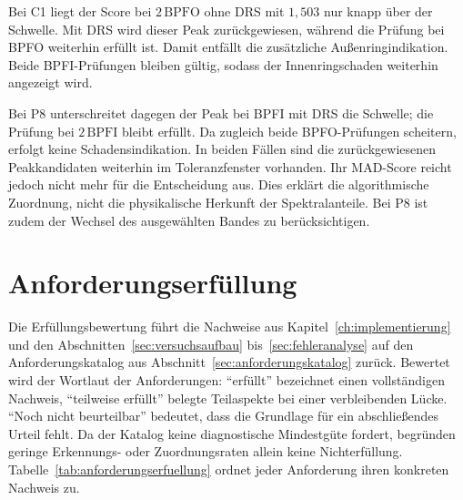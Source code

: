 Bei C1 liegt der Score bei $2\,\mathrm{BPFO}$ ohne DRS mit $1{,}503$ nur
knapp über der Schwelle. Mit DRS wird dieser Peak zurückgewiesen, während
die Prüfung bei BPFO weiterhin erfüllt ist. Damit entfällt die zusätzliche
Außenringindikation. Beide BPFI-Prüfungen bleiben gültig, sodass der
Innenringschaden weiterhin angezeigt wird.

Bei P8 unterschreitet dagegen der Peak bei BPFI mit DRS die Schwelle;
die Prüfung bei $2\,\mathrm{BPFI}$ bleibt erfüllt. Da zugleich beide
BPFO-Prüfungen scheitern, erfolgt keine Schadensindikation. In beiden Fällen
sind die zurückgewiesenen Peakkandidaten weiterhin im Toleranzfenster
vorhanden. Ihr MAD-Score reicht jedoch nicht mehr für die Entscheidung aus.
Dies erklärt die algorithmische Zuordnung, nicht die physikalische Herkunft
der Spektralanteile. Bei P8 ist zudem der Wechsel des ausgewählten Bandes
zu berücksichtigen.
\par\endgroup

\section{Anforderungserfüllung}
\label{sec:anforderungserfuellung}

Die Erfüllungsbewertung führt die Nachweise aus Kapitel~\ref{ch:implementierung}
und den Abschnitten~\ref{sec:versuchsaufbau} bis~\ref{sec:fehleranalyse} auf
den Anforderungskatalog aus Abschnitt~\ref{sec:anforderungskatalog} zurück.
Bewertet wird der Wortlaut der Anforderungen: \enquote{erfüllt} bezeichnet
einen vollständigen Nachweis, \enquote{teilweise erfüllt} belegte Teilaspekte
bei einer verbleibenden Lücke. \enquote{Noch nicht beurteilbar} bedeutet,
dass die Grundlage für ein abschließendes Urteil fehlt. Da der Katalog
keine diagnostische Mindestgüte fordert, begründen geringe Erkennungs- oder
Zuordnungsraten allein keine Nichterfüllung.
Tabelle~\ref{tab:anforderungserfuellung} ordnet jeder Anforderung ihren
konkreten Nachweis zu.

